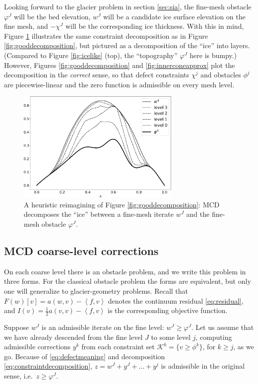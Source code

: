\documentclass[letterpaper,final,12pt,reqno]{amsart}
\theoremstyle{claim}
\newcommand{\ip}[2]{\left<#1,#2\right>}
\numberwithin{equation}{section}
\numberwithin{figure}{section}
\numberwithin{table}{section}
\numberwithin{theorem}{section}
\begin{document}
Looking forward to the glacier problem in section \ref{sec:sia}, the fine-mesh obstacle $\varphi^J$ will be the bed elevation, $w^J$ will be a candidate ice surface elevation on the fine mesh, and $-\chi^J$ will be the corresponding ice thickness.  With this in mind, Figure \ref{fig:icelikedecomposition} illustrates the same constraint decomposition as in Figure \ref{fig:gooddecomposition}, but pictured as a decomposition of the ``ice'' into layers.  (Compared to Figure \ref{fig:icelike} (top), the ``topography'' $\varphi^J$ here is bumpy.)  However, Figures \ref{fig:gooddecomposition} and \ref{fig:innerconeapprox} plot the decomposition in the \emph{correct} sense, so that defect constraints $\chi^j$ and obstacles $\phi^j$ are piecewise-linear and the zero function is admissible on every mesh level.

\begin{figure}
\includegraphics[width=0.7\textwidth]{fixfigs/icedec_defect.pdf}
\caption{A heuristic reimagining of Figure \ref{fig:gooddecomposition}: MCD decomposes the ``ice'' between a fine-mesh iterate $w^J$ and the fine-mesh obstacle $\varphi^J$.}
\label{fig:icelikedecomposition}
\end{figure}

\subsection*{MCD coarse-level corrections}  On each coarse level there is an obstacle problem, and we write this problem in three forms.  For the classical obstacle problem the forms are equivalent, but only one will generalize to glacier-geometry problems.  Recall that $F(w)[v] = a(w,v) - \ip{f}{v}$ denotes the continuum residual \eqref{eq:residual}, and $I(v) = \frac{1}{2} a(v,v) - \ip{f}{v}$ is the corresponding objective function.

Suppose $w^J$ is an admissible iterate on the fine level: $w^J\ge \varphi^J$.  Let us assume that we have already descended from the fine level $J$ to some level $j$, computing admissible corrections $y^k$ from each constraint set $\mathcal{K}^k=\{v\ge \phi^k\}$, for $k\ge j$, as we go.  Because of \eqref{eq:defectmeaning} and decomposition \eqref{eq:constraintdecomposition}, $z = w^J+y^J+\dots+y^j$ is admissible in the original sense, i.e.~$z\ge \varphi^J$.
\end{document}
